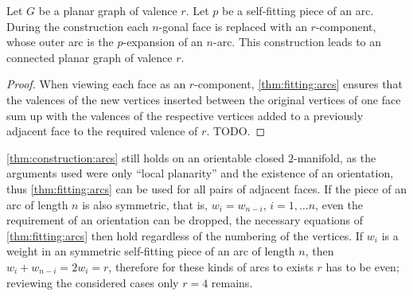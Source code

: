 \begin{construction}\label{thm:construction:arcs} Let $G$ be a planar graph of valence $r$. Let $p$ be a self-fitting piece of an arc. During the construction each $n$-gonal face is replaced with an $r$-component, whose outer arc is the $p$-expansion of an $n$-arc. This construction leads to an connected planar graph of valence $r$.
  \begin{proof}
    When viewing each face as an $r$-component, \autoref{thm:fitting:arcs} ensures that the valences of the new vertices inserted between the original vertices of one face sum up with the valences of the respective vertices added to a previously adjacent face to the required valence of $r$. TODO.
  \end{proof}
\end{construction}

\begin{remark}
  \autoref{thm:construction:arcs} still holds on an orientable closed $2$-manifold, as the arguments used were only ``local planarity'' and the existence of an orientation, thus \autoref{thm:fitting:arcs} can be used for all pairs of adjacent faces. If the piece of an arc of length $n$ is also symmetric, that is, $w_i = w_{n-i}$, $i = 1, \dots n$, even the requirement of an orientation can be dropped, the necessary equations of \autoref{thm:fitting:arcs} then hold regardless of the numbering of the vertices. If $w_i$ is a weight in an symmetric self-fitting piece of an arc of length $n$, then $w_i + w_{n-i} = 2 w_i = r$, therefore for these kinds of arcs to exists $r$ has to be even; reviewing the considered cases only $r = 4$ remains.
\end{remark}
